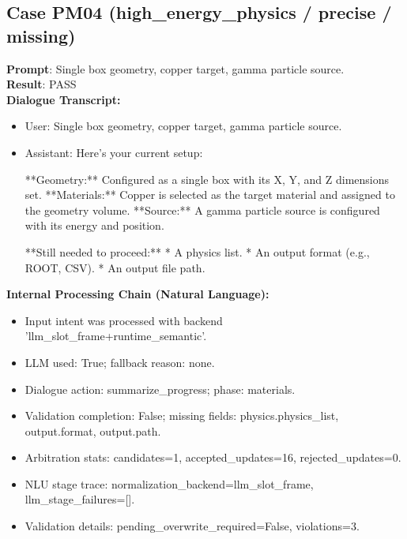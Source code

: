 \documentclass[11pt]{ctexart}
\begin{document}
\subsection{Case PM04 (high\_energy\_physics / precise / missing)}
\textbf{Prompt}: Single box geometry, copper target, gamma particle source.\\
\textbf{Result}: PASS\\
\textbf{Dialogue Transcript:}
\begin{itemize}
\item User: Single box geometry, copper target, gamma particle source.
\item Assistant: Here's your current setup:

**Geometry:** Configured as a single box with its X, Y, and Z dimensions set.
**Materials:** Copper is selected as the target material and assigned to the geometry volume.
**Source:** A gamma particle source is configured with its energy and position.

**Still needed to proceed:**
*   A physics list.
*   An output format (e.g., ROOT, CSV).
*   An output file path.
\end{itemize}
\textbf{Internal Processing Chain (Natural Language):}
\begin{itemize}
\item Input intent was processed with backend 'llm\_slot\_frame+runtime\_semantic'.
\item LLM used: True; fallback reason: none.
\item Dialogue action: summarize\_progress; phase: materials.
\item Validation completion: False; missing fields: physics.physics\_list, output.format, output.path.
\item Arbitration stats: candidates=1, accepted\_updates=16, rejected\_updates=0.
\item NLU stage trace: normalization\_backend=llm\_slot\_frame, llm\_stage\_failures=[].
\item Validation details: pending\_overwrite\_required=False, violations=3.
\end{itemize}
\end{document}
